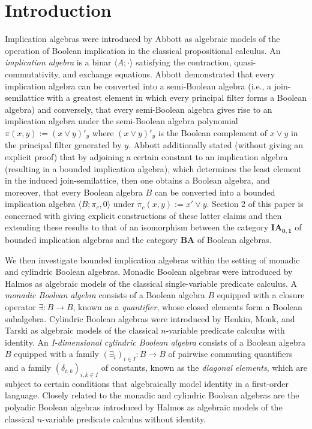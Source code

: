 \documentclass[reqno]{amsart}
\theoremstyle{plain}
\theoremstyle{definition}
\begin{document}
\section{Introduction}
Implication algebras were introduced by Abbott \cite{abbott672} as algebraic models of the operation of Boolean implication in the classical propositional calculus. An \emph{implication algebra} is a binar $\langle A;\cdot\rangle$ satisfying the contraction, quasi-commutativity, and exchange equations. Abbott demonstrated that every implication algebra can be converted into a semi-Boolean algebra (i.e., a join-semilattice with a greatest element in which every principal filter forms a Boolean algebra) and conversely, that every semi-Boolean algebra gives rise to an implication algebra under the semi-Boolean algebra polynomial $\pi(x,y):=(x\vee y)'_y$ where $(x\vee y)'_y$ is the Boolean complement of $x\vee y$ in the principal filter generated by $y$. Abbott additionally stated (without giving an explicit proof) that by adjoining a certain constant to an implication algebra (resulting in a bounded implication algebra), which determines the least element in the induced join-semilattice, then one obtains a Boolean algebra, and moreover, that every Boolean algebra $B$ can be converted into a bounded implication algebra $\langle B;\pi_c,0\rangle$ under $\pi_c(x,y):=x'\vee y$. Section 2 of this paper is concerned with giving explicit constructions of these latter claims and then extending these results to that of an isomorphism between the category $\mathbf{IA_{0,1}}$ of bounded implication algebras and the category $\mathbf{BA}$ of Boolean algebras.    

We then investigate bounded implication algebras within the setting of monadic and cylindric Boolean algebras. Monadic Boolean algebras were introduced by Halmos \cite{halmos} as algebraic models of the classical single-variable predicate calculus. A \emph{monadic Boolean algebra} consists of a Boolean algebra $B$ equipped with a closure operator $\exists\colon B\to B$, known as a \emph{quantifier}, whose closed elements form a Boolean subalgebra. Cylindric Boolean algebras were introduced by Henkin, Monk, and Tarski \cite{tarski1, tarski2} as algebraic models of the classical $n$-variable predicate calculus with identity. An \emph{I-dimensional cylindric Boolean algebra} consists of a Boolean algebra $B$ equipped with a family $(\exists_i)_{i\in I}\colon B\to B$ of pairwise commuting quantifiers and a family $(\delta_{i,k})_{i,k\in I}$ of constants, known as the \emph{diagonal elements}, which are subject to certain conditions that algebraically model identity in a first-order language. Closely related to the monadic and cylindric Boolean algebras are the polyadic Boolean algebras introduced by Halmos \cite{halmos} as algebraic models of the classical $n$-variable predicate calculus without identity.  
\end{document}
